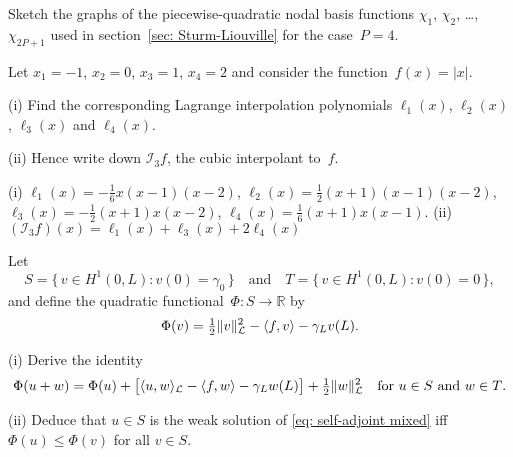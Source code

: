 \begin{Exercises}
\exercise
Sketch the graphs of the piecewise-quadratic nodal basis functions $\chi_1$, 
$\chi_2$, \dots, $\chi_{2P+1}$ used in section~\ref{sec: Sturm-Liouville}
for the case~$P=4$.

\exercise
Let $x_1=-1$, $x_2=0$, $x_3=1$, $x_4=2$ and consider the 
function~$f(x)=|x|$.
\begin{description}
\item{(i)} Find the corresponding Lagrange interpolation polynomials 
$\ell_1(x)$, $\ell_2(x)$, $\ell_3(x)$ and $\ell_4(x)$.
\item{(ii)} Hence write down $\mathcal{I}_3f$, the cubic interpolant to~$f$.
\end{description}
\begin{ans}
(i) $\ell_1(x)=-\tfrac16 x(x-1)(x-2)$, $\ell_2(x)=\tfrac12(x+1)(x-1)(x-2)$,
$\ell_3(x)=-\tfrac12(x+1)x(x-2)$, $\ell_4(x)=\tfrac16(x+1)x(x-1)$.\quad
(ii) $(\mathcal{I}_3f)(x)=\ell_1(x)+\ell_3(x)+2\ell_4(x)$
\end{ans}

\exercise
Let
\[
S=\{\,v\in H^1(0,L):v(0)=\gamma_0\,\}
\quad\text{and}\quad
T=\{\,v\in H^1(0,L):v(0)=0\,\},
\]
and define the quadratic functional~$\Phi:S\to\mathbb{R}$ by
\[
\Phi(v)=\tfrac12\|v\|_{\mathcal{L}}^2-\langle f,v\rangle-\gamma_L v(L).
\]
\begin{description}
\item{(i)}
Derive the identity
\[
\Phi(u+w)=\Phi(u)+\bigl[\langle u,w\rangle_{\mathcal{L}}
    -\langle f,w\rangle-\gamma_Lw(L)\bigr]+\tfrac12\|w\|_{\mathcal{L}}^2
\quad\text{for $u\in S$ and $w\in T$.}
\]
\item{(ii)}
Deduce that $u\in S$ is the weak solution of \eqref{eq: self-adjoint mixed}
iff $\Phi(u)\le\Phi(v)$ for all $v\in S$.
\end{description}

\end{Exercises}
